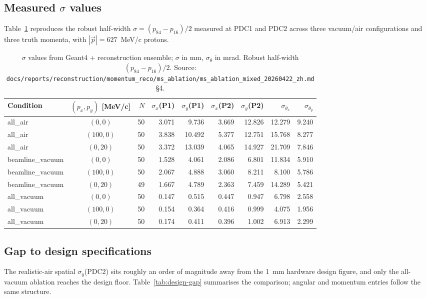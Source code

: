 \documentclass[a4paper, 11pt]{article}
\begin{document}
\subsection{Measured \texorpdfstring{$\sigma$}{sigma} values}
Table~\ref{tab:sigma-three-conditions} reproduces the robust half-width $\sigma = (p_{84}-p_{16})/2$ measured at PDC1 and PDC2 across three vacuum/air configurations and three truth momenta, with $|\vec p|=627$~MeV/c protons.

\begin{table}[H]
  \centering
  \small
  \begin{tabular}{lcrrrrrrr}
    \toprule
    Condition & $(p_x, p_y)$ [MeV/c] & $N$ & $\sigma_x$(P1) & $\sigma_y$(P1) & $\sigma_x$(P2) & $\sigma_y$(P2) & $\sigma_{\theta_x}$ & $\sigma_{\theta_y}$ \\
    \midrule
    all\_air         & $(0,0)$    & 50 & 3.071 & 9.736  & 3.669 & 12.826 & 12.279 & 9.240 \\
    all\_air         & $(100,0)$  & 50 & 3.838 & 10.492 & 5.377 & 12.751 & 15.768 & 8.277 \\
    all\_air         & $(0,20)$   & 50 & 3.372 & 13.039 & 4.065 & 14.927 & 21.709 & 7.846 \\
    \midrule
    beamline\_vacuum & $(0,0)$    & 50 & 1.528 & 4.061  & 2.086 & 6.801  & 11.834 & 5.910 \\
    beamline\_vacuum & $(100,0)$  & 50 & 2.067 & 4.888  & 3.060 & 8.211  & 8.100  & 5.786 \\
    beamline\_vacuum & $(0,20)$   & 49 & 1.667 & 4.789  & 2.363 & 7.459  & 14.289 & 5.421 \\
    \midrule
    all\_vacuum      & $(0,0)$    & 50 & 0.147 & 0.515  & 0.447 & 0.947  & 6.798  & 2.558 \\
    all\_vacuum      & $(100,0)$  & 50 & 0.154 & 0.364  & 0.416 & 0.999  & 4.075  & 1.956 \\
    all\_vacuum      & $(0,20)$   & 50 & 0.174 & 0.411  & 0.396 & 1.002  & 6.913  & 2.299 \\
    \bottomrule
  \end{tabular}
  \caption{$\sigma$ values from Geant4 + reconstruction ensemble; $\sigma$ in mm, $\sigma_\theta$ in mrad. Robust half-width $(p_{84}-p_{16})/2$. Source: \texttt{docs/reports/reconstruction/momentum\_reco/ms\_ablation/ms\_ablation\_mixed\_20260422\_zh.md} §4.}
  \label{tab:sigma-three-conditions}
\end{table}

\subsection{Gap to design specifications}
The realistic-air spatial $\sigma_y$(PDC2) sits roughly an order of magnitude away from the 1~mm hardware design figure, and only the all-vacuum ablation reaches the design floor. Table~\ref{tab:design-gap} summarises the comparison; angular and momentum entries follow the same structure.
\end{document}
